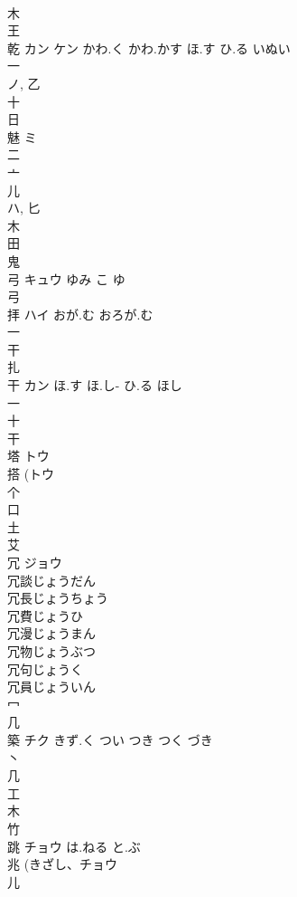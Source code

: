 \documentclass[8pt]{extreport}
\begin{document}
\begin{CJK}{UTF8}{min}
\\	木 
\\	王 
\\	乾	カン ケン	かわ.く かわ.かす ほ.す ひ.る いぬい	
\\	一 
\\	ノ, 乙 
\\	十 
\\	日 
\\	魅	ミ		
\\	二 
\\	亠 
\\	儿 
\\	ハ, 匕 
\\	木 
\\	田 
\\	鬼 
\\	弓	キュウ	ゆみ こ ゆ	
\\	弓 
\\	拝	ハイ	おが.む おろが.む	
\\	一 
\\	干 
\\	扎	
\\	干	カン	ほ.す ほ.し- ひ.る ほし	
\\	一 
\\	十 
\\	干 
\\	塔	トウ		
\\	搭 (トウ 
\\	个 
\\	口 
\\	土 
\\	艾 
\\	冗	ジョウ		
\\	冗談じょうだん
\\	冗長じょうちょう
\\	冗費じょうひ
\\	冗漫じょうまん
\\	冗物じょうぶつ
\\	冗句じょうく
\\	冗員じょういん
\\	冖 
\\	几 
\\	築	チク	きず.く つい つき つく づき	
\\	丶 
\\	几 
\\	工 
\\	木 
\\	竹 
\\	跳	チョウ	は.ねる と.ぶ	
\\	兆 (きざし、チョウ 
\\	儿 

\end{CJK}
\end{document}
